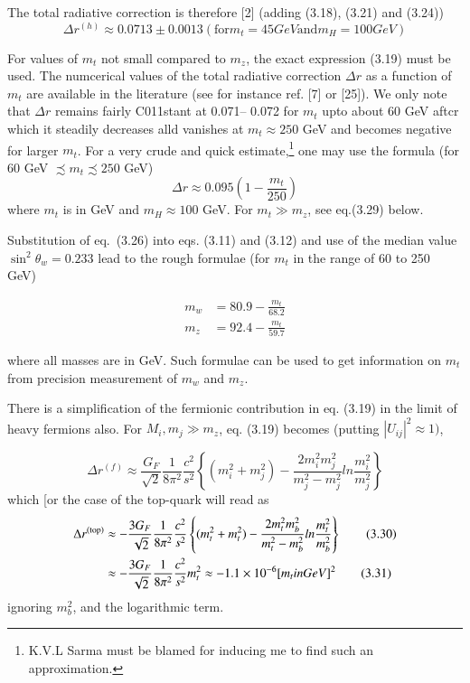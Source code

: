 {The total radiative correction is therefore [2] (adding (3.18), (3.21) and
(3.24))
\begin{equation*}
\Delta r^{(h)} \approx 0.0713\pm 0.0013 (\text{for} m_{t}=45 GeV \text{and} m_{H}=100 GeV)\tag{3.25}
\end{equation*}

For values of $m_{t}$ not small compared to $m_{z}$, the exact expression (3.19)
must be used. The numcerical values of the total radiative correction $\Delta r$ as a
function of $m_{t}$ are available in the literature (see for instance ref. [7] or [25]).
We only note that $\Delta r$ remains fairly C011stant at 0.071-- 0.072 for $m_{t}$ upto about
60 GeV aftcr which it steadily decreases alld vanishes at $m_{t} \approx 250$ GeV and
becomes negative for larger $m_{t}$. For a very crude and quick estimate,\footnote{K.V.L Sarma must be blamed for inducing me to find such an approximation.} one may
use the formula (for 60 GeV $ \precsim m_{t}  \precsim  250$ GeV)
\begin{equation*}
\Delta r \approx 0.095 \left(1- \frac{m_{t}}{250} \right)\tag{3.26}
\end{equation*}
where $m_{t}$ is in GeV and $m_{H}\approx 100$ GeV. For $m_{t}\gg m_{z}$, see eq.(3.29) below. 

Substitution of eq.~(3.26) into eqs. (3.11) and (3.12) and use of the median
value $\sin^{2}\theta_{w}= 0.233$ lead to the rough formulae (for $m_{t}$ in the range of 60 to
250 GeV)

\begin{align*}
m_{w} &= 80.9-\frac{m_{t}}{68.2}\tag{3.27}\\
m_{z} &=92.4-\frac{m_{t}}{59.7}\tag{3.28}
\end{align*} 

where all masses are in GeV. Such formulae can be used to get information on
$m_{t}$ from precision measurement of $m_{w}$ and $m_{z}$.

There is a simplification of the fermionic contribution in eq. (3.19) in the
limit of heavy fermions also. For $M_{i}, m_{j} \gg m_{z}$, eq. (3.19) becomes (putting
$|U_{ij}|^{2} \approx 1)$,
 
 \begin{equation*}
 \Delta r^{(f)} \approx \frac{G_{F}}{\sqrt{2}} \frac{1}{8 \pi^{2}} \frac{c^{2}}{s^{2}} \left\{(m^{2}_{i}+ m^{2}_{j})- \frac{2m^{2}_{i}m^{2}_{j}}{m^{2}_{j}-m^{2}_{j}} ln \frac{m^{2}_{i}}{m^{2}_{j}} \right\}\tag{3.29}
 \end{equation*}
 which [or the case of the top-quark will read as 
 \begin{align*}
 \Delta r^{(\rm top)} &\approx  - \frac{3 G_{F}}{\sqrt{2}} \frac{1}{8 \pi^{2}}\frac{c^{2}}{s^{2}} \left\{(m^{2}_{t} + m^{2}_{t})- \frac{2m^{2}_{t}m^{2}_{b}}{m^{2}_{t}-m^{2}_{b}} ln \frac{m^{2}_{t}}{m^{2}_{b}} \right\}\tag{3.30}\\
 & \approx -\frac{3 G_{F}}{\sqrt{2}} \frac{1}{8 \pi^{2}}\frac{c^{2}}{s^{2}} m^{2}_{t} \approx -1.1 \times 10^{-6} [m_{t} in GeV]^{2}\tag{3.31}
 \end{align*}
ignoring $m^{2}_{b}$, and the logarithmic term.

}
